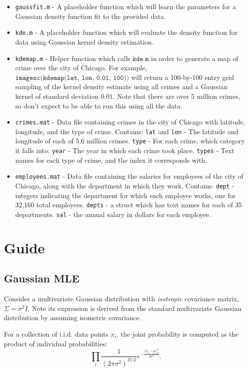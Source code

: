 \documentclass[11pt,noanswers,addpoints]{exam}
\begin{document}
\begin{itemize}
\item \texttt{gaussfit.m} - A placeholder function which will learn the parameters for a Gaussian density function
fit to the provided data.
\item \texttt{kde.m} - A placeholder function which will evaluate the density function for data using Gaussian kernel 
density estimation.
\item \texttt{kdemap.m} - Helper function which calls $\texttt{kde.m}$ in order to generate a map of crime over the 
city of Chicago. For example, $\texttt{imagesc(kdemap(lat, lon, 0.01, 100))}$ will return a 100-by-100 entry grid
sampling of the kernel density estimate using all crimes and a Gaussian kernel of standard deviation $0.01$. Note that
there are over 5 million crimes, so don't expect to be able to run this using all the data.
\item \texttt{crimes.mat} - Data file containing crimes in the city of Chicago with latitude, longitude, and 
the type of crime. Contains: \texttt{lat} and \texttt{lon} - The latitude and longitude of each of 5.6 million crimes.
\texttt{type} - For each crime, which category it falls into. \texttt{year} - The year in which each crime took place.
\texttt{types} - Text names for each type of crime, and the index it corresponds with.
\item \texttt{employees.mat} - Data file containing the salaries for employees of the city of Chicago,
along with the department in which they work. Contains: \texttt{dept} - integers indicating the department
for which each employee works, one for 32,160 total employees. \texttt{depts} - a struct which has text names
for each of 35 departments. \texttt{sal} - the annual salary in dollars for each employee.
\end{itemize}

\section{Guide}

\subsection{Gaussian MLE}
Consider a multivariate Gaussian distribution with \emph{isotropic} covariance matrix, $\Sigma=\sigma^2 I$. 
Note its expression is derived from the standard multivariate Gaussian distribution by assuming isometric covariance.

For a collection of i.i.d. data points $x_i$, the joint probability is computed as the product of individual probabilities:
$$\prod_i \frac{1}{(2\pi\sigma^2)^{D/2}} e^{-\frac{||x_i - \mu||_2^2}{2\sigma^2}}.$$
\end{document}
